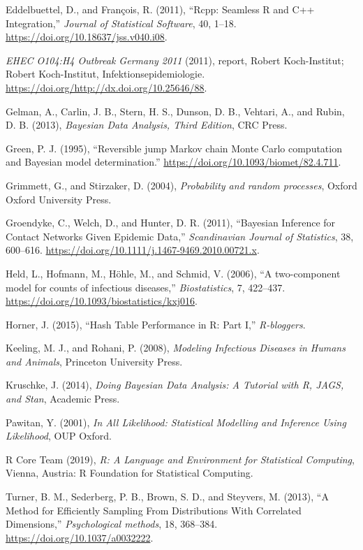 \documentclass[11pt,a4paper]{article}
\numberwithin{equation}{section}
\begin{document}
\leavevmode\hypertarget{ref-eddelbuettel_rcpp_2011}{}%
Eddelbuettel, D., and François, R. (2011), ``Rcpp: Seamless R and C++
Integration,'' \emph{Journal of Statistical Software}, 40, 1--18.
\url{https://doi.org/10.18637/jss.v040.i08}.

\leavevmode\hypertarget{ref-noauthor_ehec_2011}{}%
\emph{EHEC O104:H4 Outbreak Germany 2011} (2011), report, Robert
Koch-Institut; Robert Koch-Institut, Infektionsepidemiologie.
\url{https://doi.org/http://dx.doi.org/10.25646/88}.

\leavevmode\hypertarget{ref-gelman_bayesian_2013}{}%
Gelman, A., Carlin, J. B., Stern, H. S., Dunson, D. B., Vehtari, A., and
Rubin, D. B. (2013), \emph{Bayesian Data Analysis, Third Edition}, CRC
Press.

\leavevmode\hypertarget{ref-green_reversible_1995}{}%
Green, P. J. (1995), ``Reversible jump Markov chain Monte Carlo
computation and Bayesian model determination.''
\url{https://doi.org/10.1093/biomet/82.4.711}.

\leavevmode\hypertarget{ref-grimmett_probability_2004}{}%
Grimmett, G., and Stirzaker, D. (2004), \emph{Probability and random
processes}, Oxford Oxford University Press.

\leavevmode\hypertarget{ref-groendyke_bayesian_2011}{}%
Groendyke, C., Welch, D., and Hunter, D. R. (2011), ``Bayesian Inference
for Contact Networks Given Epidemic Data,'' \emph{Scandinavian Journal
of Statistics}, 38, 600--616.
\url{https://doi.org/10.1111/j.1467-9469.2010.00721.x}.

\leavevmode\hypertarget{ref-held_two-component_2006}{}%
Held, L., Hofmann, M., Höhle, M., and Schmid, V. (2006), ``A
two-component model for counts of infectious diseases,''
\emph{Biostatistics}, 7, 422--437.
\url{https://doi.org/10.1093/biostatistics/kxj016}.

\leavevmode\hypertarget{ref-horner_hash_2015}{}%
Horner, J. (2015), ``Hash Table Performance in R: Part I,''
\emph{R-bloggers}.

\leavevmode\hypertarget{ref-keeling_modeling_2008}{}%
Keeling, M. J., and Rohani, P. (2008), \emph{Modeling Infectious
Diseases in Humans and Animals}, Princeton University Press.

\leavevmode\hypertarget{ref-kruschke_doing_2014}{}%
Kruschke, J. (2014), \emph{Doing Bayesian Data Analysis: A Tutorial with
R, JAGS, and Stan}, Academic Press.

\leavevmode\hypertarget{ref-pawitan_all_2001}{}%
Pawitan, Y. (2001), \emph{In All Likelihood: Statistical Modelling and
Inference Using Likelihood}, OUP Oxford.

\leavevmode\hypertarget{ref-r_core_team_r_2019}{}%
R Core Team (2019), \emph{R: A Language and Environment for Statistical
Computing}, Vienna, Austria: R Foundation for Statistical Computing.

\leavevmode\hypertarget{ref-turner_method_2013}{}%
Turner, B. M., Sederberg, P. B., Brown, S. D., and Steyvers, M. (2013),
``A Method for Efficiently Sampling From Distributions With Correlated
Dimensions,'' \emph{Psychological methods}, 18, 368--384.
\url{https://doi.org/10.1037/a0032222}.
\end{document}
